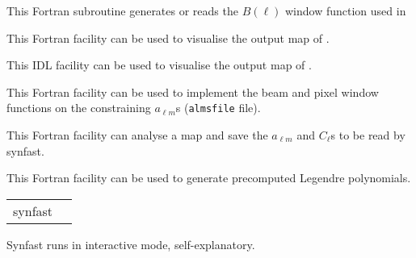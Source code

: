 \begin{support}
  \begin{sulist}{} %
  \item[\htmlref{generate\_beam}{sub:generate_beam}] This \healpix Fortran
subroutine generates or reads the $B(\ell)$ window function used in \thedocid
  \item[\htmlref{map2gif}{fac:map2gif}] This \healpix Fortran facility can be used to visualise the
  output map of \thedocid.
  \item[\htmlref{mollview}{idl:mollview}] This \healpix IDL facility can be used to visualise the
  output map of \thedocid.
  \item[\htmlref{alteralm}{fac:alteralm}] This \healpix Fortran facility can be
  used to implement the beam and pixel window functions on the constraining
  $a_{\ell m}$s ({\tt almsfile} file).
  \item[\htmlref{anafast}{fac:anafast}] This \healpix Fortran facility can analyse a \healpix map and 
     	       save the $a_{\ell m}$ and $C_{\ell}$s to be read by synfast.
  \item[\htmlref{plmgen}{fac:plmgen}] This \healpix Fortran facility can be used to generate precomputed Legendre polynomials.
		
  \end{sulist}
\end{support}

\begin{examples}{1}
{
\begin{tabular}{ll} %
synfast  \\
\end{tabular}
}
{
Synfast runs in interactive mode, self-explanatory.
}
\end{examples}

\vfill\newpage

